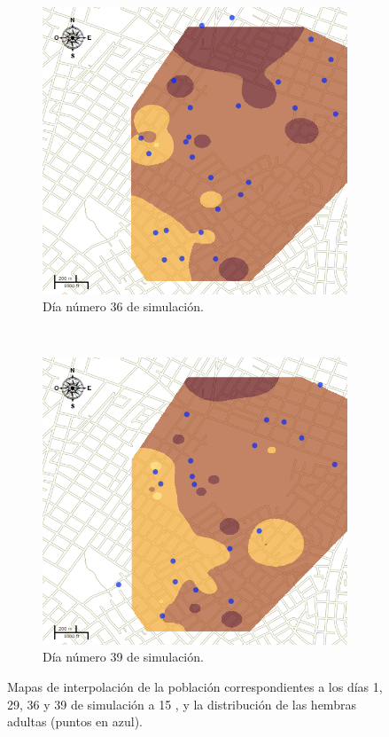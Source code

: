 \begin{figure}[!htbp]
    \begin{subfigure}[b]{0.45\textwidth}
            \includegraphics[width=\textwidth]{capitulo-6/graphics/raster/temp-20-35.png}
            \caption{\label{fig:niveles-infestacion-20-c}Día número 36 de simulación.}
    \end{subfigure}
    ~~
    \begin{subfigure}[b]{0.45\textwidth}
            \includegraphics[width=\textwidth]{capitulo-6/graphics/raster/temp-20-38.png}
            \caption{\label{fig:niveles-infestacion-20-d}Día número 39 de simulación.}
    \end{subfigure}

    \caption{\label{fig:niveles-infestacion-20} Mapas de interpolación de la población correspondientes a los días 1, 29, 36 y 39 de simulación a 15 \textcelsius, y la distribución de las hembras adultas (puntos en azul). }
\end{figure}
